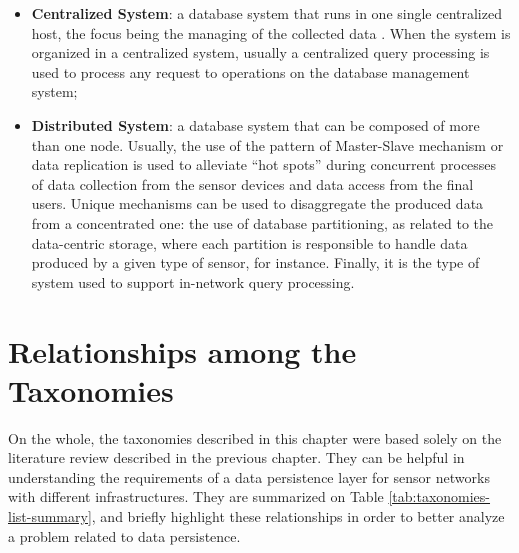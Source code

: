 \begin{itemize}
  \item \textbf{Centralized System}: a database system that runs in one single
  centralized host, the focus being the managing of the collected data
  \cite{sn-intro01}. When the system is organized in a centralized system,
  usually a centralized query processing is used to process any request to
  operations on the database management system;
  \item \textbf{Distributed System}: a database system that can be composed of
  more than one node. Usually, the use of the pattern of Master-Slave
  mechanism or data replication \cite{sn-data-center-replication-load-balance} 
  is used to alleviate ``hot spots'' during concurrent processes of data
  collection from the sensor devices and data access from the final users.
  Unique mechanisms can be used to disaggregate the produced data from a
  concentrated one: the use of database partitioning, as related to the
  data-centric storage, where each partition is responsible to handle data
 produced by a given type of sensor, for instance. Finally, it is the type of
 system used to support in-network query processing.
\end{itemize}

\section{Relationships among the Taxonomies}

On the whole, the taxonomies described in this chapter were based solely on the
literature review described in the previous chapter. They can be helpful in 
understanding the requirements of a data persistence layer for sensor networks
with different infrastructures. They are summarized on Table
\ref{tab:taxonomies-list-summary}, and briefly highlight these
relationships in order to better analyze a problem related to data persistence.

